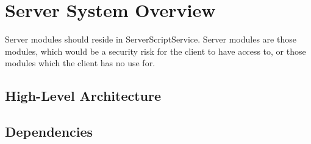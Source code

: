 \chapter{Server System Overview}
Server modules should reside in ServerScriptService. Server modules are those modules, which would be a security risk for the client to have access to, or those modules which the client has no use for.
\section{High-Level Architecture}
\section{Dependencies}

